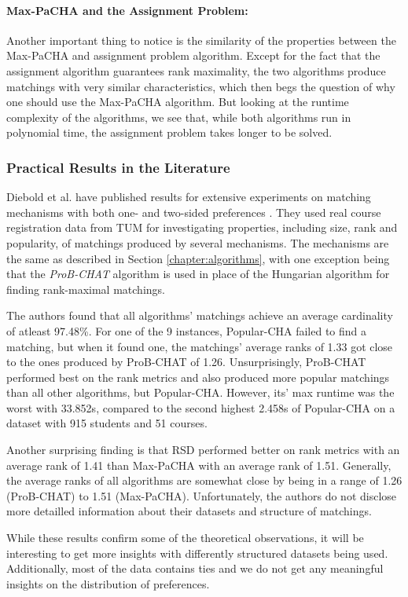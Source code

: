 \paragraph{Max-PaCHA and the Assignment Problem:}
Another important thing to notice is the similarity of the properties between the Max-PaCHA and assignment problem algorithm. Except for the fact that the assignment algorithm guarantees rank maximality, the two algorithms produce matchings with very similar characteristics, which then begs the question of why one should use the Max-PaCHA algorithm. But looking at the runtime complexity of the algorithms, we see that, while both algorithms run in polynomial time, the assignment problem takes longer to be solved.

\subsubsection{Practical Results in the Literature}\label{sec:practical-results-lit}
Diebold et al. have published results for extensive experiments on matching mechanisms with both one- and two-sided preferences \cite{DieboldBenchmark}. They used real course registration data from TUM for investigating properties, including size, rank and popularity, of matchings produced by several mechanisms. The mechanisms are the same as described in Section \ref{chapter:algorithms}, with one exception being that the \emph{ProB-CHAT} algorithm \cite{DieboldBenchmark} is used in place of the Hungarian algorithm for finding rank-maximal matchings.

The authors found that all algorithms' matchings achieve an average cardinality of atleast 97.48\%. For one of the 9 instances, Popular-CHA failed to find a matching, but when it found one, the matchings' average ranks of 1.33 got close to the ones produced by ProB-CHAT of 1.26. Unsurprisingly, ProB-CHAT performed best on the rank metrics and also produced more popular matchings than all other algorithms, but Popular-CHA. However, its' max runtime was the worst with 33.852s, compared to the second highest 2.458s of Popular-CHA on a dataset with 915 students and 51 courses.

Another surprising finding is that RSD performed better on rank metrics with an average rank of 1.41 than Max-PaCHA with an average rank of 1.51. Generally, the average ranks of all algorithms are somewhat close by being in a range of 1.26 (ProB-CHAT) to 1.51 (Max-PaCHA). Unfortunately, the authors do not disclose more detailled information about their datasets and structure of matchings. 

While these results confirm some of the theoretical observations, it will be interesting to get more insights with differently structured datasets being used. Additionally, most of the data contains ties and we do not get any meaningful insights on the distribution of preferences. 
